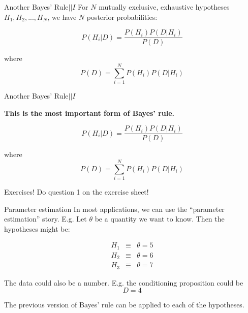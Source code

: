 \documentclass{beamer}
\begin{document}
\begin{frame}[t]{Another Bayes' Rule\hspace{170pt}$|| I$}
For $N$ mutually exclusive, exhaustive hypotheses
$H_1, H_2, ..., H_N$, we have $N$ posterior probabilities:

\begin{equation}
P(H_i | D) = \frac{P(H_i)P(D|H_i)}{P(D)}
\end{equation}

where
\begin{equation}
P(D) = \sum_{i=1}^N P(H_i)P(D|H_i)
\end{equation}
\end{frame}

\begin{frame}[t]{Another Bayes' Rule\hspace{170pt}$|| I$}

{\bf This is the most important form of Bayes' rule.}

\begin{equation}
P(H_i | D) = \frac{P(H_i)P(D|H_i)}{P(D)}
\end{equation}

where
\begin{equation}
P(D) = \sum_{i=1}^N P(H_i)P(D|H_i)
\end{equation}
\end{frame}


\begin{frame}[t]{Exercises!}
Do question 1 on the exercise sheet!
\end{frame}

\begin{frame}[t]{Parameter estimation}
In most applications, we can use the ``parameter estimation'' story. E.g.
Let $\theta$ be a quantity we want to know. Then the hypotheses might be:

\begin{eqnarray}
H_1 &\equiv& \theta = 5\\
H_2 &\equiv& \theta = 6\\
H_3 &\equiv& \theta = 7
\end{eqnarray}

The data could also be a number. E.g. the conditioning proposition could be
\begin{equation}
D = 4
\end{equation}

The previous version of Bayes' rule can be applied to each of the
hypotheses.
\end{frame}
\end{document}
